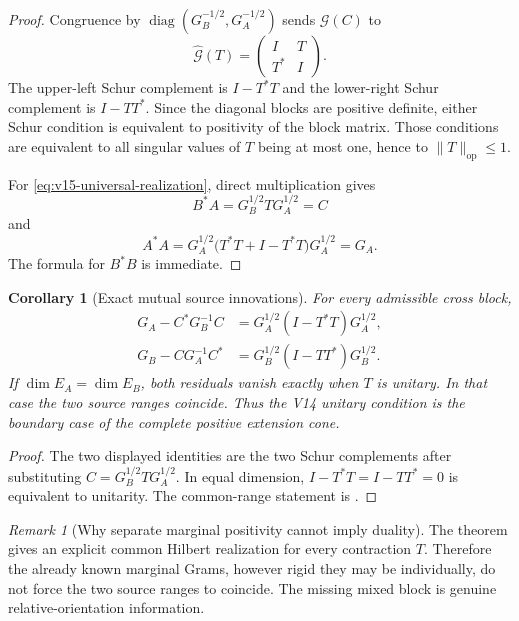 \documentclass[11pt]{article}
\newtheorem{corollary}[corollary]{Corollary}
\theoremstyle{definition}
\theoremstyle{remark}
\newtheorem{remark}[remark]{Remark}
\newcommand{\op}{\mathrm{op}}
\newcommand{\norm}[1]{\lVert#1\rVert}
\begin{document}
\begin{proof}
Congruence by
$\operatorname{diag}(G_B^{-1/2},G_A^{-1/2})$ sends
$\mathcal G(C)$ to
\[
 \widehat{\mathcal G}(T)
 =\begin{pmatrix}I&T\\T^*&I\end{pmatrix}.
\]
The upper-left Schur complement is $I-T^*T$ and the lower-right Schur
complement is $I-TT^*$.  Since the diagonal blocks are positive definite,
either Schur condition is equivalent to positivity of the block matrix.
Those conditions are equivalent to all singular values of $T$ being at most
one, hence to $\norm T_{\op}\le1$.

For \eqref{eq:v15-universal-realization}, direct multiplication gives
\[
 B^*A=G_B^{1/2}TG_A^{1/2}=C
\]
and
\[
 A^*A
 =G_A^{1/2}\bigl(T^*T+I-T^*T\bigr)G_A^{1/2}
 =G_A.
\]
The formula for $B^*B$ is immediate.
\end{proof}

\begin{corollary}[Exact mutual source innovations]
\label{cor:v15-general-shorts}
For every admissible cross block,
\begin{align}
 G_A-C^*G_B^{-1}C
 &=G_A^{1/2}(I-T^*T)G_A^{1/2},
 \label{eq:v15-short-A}\\
 G_B-CG_A^{-1}C^*
 &=G_B^{1/2}(I-TT^*)G_B^{1/2}.
 \label{eq:v15-short-B}
\end{align}
If $\dim E_A=\dim E_B$, both residuals vanish exactly when $T$ is unitary.
In that case the two source ranges coincide.  Thus the V14 unitary condition
is the boundary case of the complete positive extension cone.
\end{corollary}

\begin{proof}
The two displayed identities are the two Schur complements after substituting
$C=G_B^{1/2}TG_A^{1/2}$.  In equal dimension,
$I-T^*T=I-TT^*=0$ is equivalent to unitarity.  The common-range statement is
.
\end{proof}

\begin{remark}[Why separate marginal positivity cannot imply duality]
The theorem gives an explicit common Hilbert realization for every
contraction $T$.  Therefore the already known marginal Grams, however rigid
they may be individually, do not force the two source ranges to coincide.
The missing mixed block is genuine relative-orientation information.
\end{remark}
\end{document}
